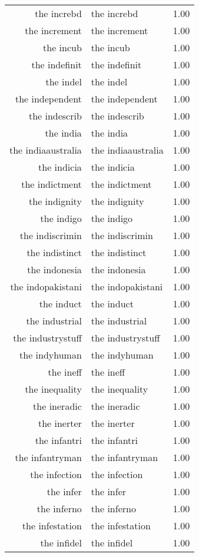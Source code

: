 \begin{table}[ht]
\begin{tabular}{rlr}
  the increbd & the increbd & 1.00 \\ 
  the increment & the increment & 1.00 \\ 
  the incub & the incub & 1.00 \\ 
  the indefinit & the indefinit & 1.00 \\ 
  the indel & the indel & 1.00 \\ 
  the independent & the independent & 1.00 \\ 
  the indescrib & the indescrib & 1.00 \\ 
  the india & the india & 1.00 \\ 
  the indiaaustralia & the indiaaustralia & 1.00 \\ 
  the indicia & the indicia & 1.00 \\ 
  the indictment & the indictment & 1.00 \\ 
  the indignity & the indignity & 1.00 \\ 
  the indigo & the indigo & 1.00 \\ 
  the indiscrimin & the indiscrimin & 1.00 \\ 
  the indistinct & the indistinct & 1.00 \\ 
  the indonesia & the indonesia & 1.00 \\ 
  the indopakistani & the indopakistani & 1.00 \\ 
  the induct & the induct & 1.00 \\ 
  the industrial & the industrial & 1.00 \\ 
  the industrystuff & the industrystuff & 1.00 \\ 
  the indyhuman & the indyhuman & 1.00 \\ 
  the ineff & the ineff & 1.00 \\ 
  the inequality & the inequality & 1.00 \\ 
  the ineradic & the ineradic & 1.00 \\ 
  the inerter & the inerter & 1.00 \\ 
  the infantri & the infantri & 1.00 \\ 
  the infantryman & the infantryman & 1.00 \\ 
  the infection & the infection & 1.00 \\ 
  the infer & the infer & 1.00 \\ 
  the inferno & the inferno & 1.00 \\ 
  the infestation & the infestation & 1.00 \\ 
  the infidel & the infidel & 1.00 \\ 

\end{tabular}
\end{table}

